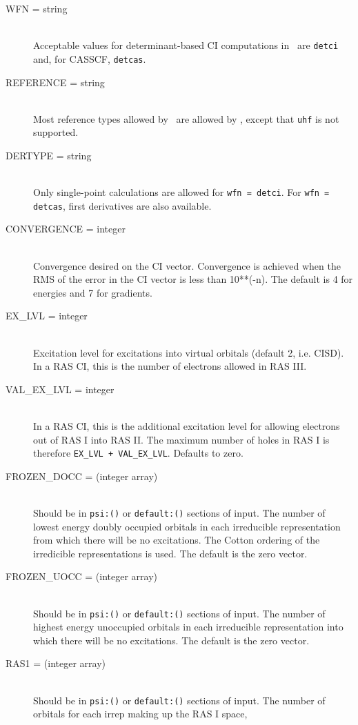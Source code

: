 \begin{description}
\item[WFN = string]\mbox{}\\
Acceptable values for determinant-based CI computations in \PSIthree\
are {\tt detci} and, for CASSCF, {\tt detcas}.
\item[REFERENCE = string]\mbox{}\\
Most reference types allowed by \PSIthree\ are allowed by \PSIdetci,
except that {\tt uhf} is not supported.
\item[DERTYPE = string]\mbox{}\\
Only single-point calculations are allowed for {\tt wfn = detci}.
For {\tt wfn = detcas}, first derivatives are also available.
\item[CONVERGENCE = integer]\mbox{}\\
Convergence desired on the CI vector.  Convergence is achieved when the
RMS of the error in the CI vector is less than 10**(-n).  The default is 4
for energies and 7 for gradients.
\item[EX\_LVL = integer]\mbox{}\\
Excitation level for excitations into virtual
orbitals (default 2, i.e. CISD).  In a RAS CI, this is the number
of electrons allowed in RAS III.
\item[VAL\_EX\_LVL = integer]\mbox{}\\
In a RAS CI, this is the additional excitation level for allowing
electrons out of RAS I into RAS II.  The maximum number of holes in RAS I
is therefore {\tt EX\_LVL + VAL\_EX\_LVL}.  Defaults to zero.
\item[FROZEN\_DOCC = (integer array)]\mbox{}\\
Should be in {\tt psi:()} or {\tt default:()} sections of input.
The number of lowest energy doubly occupied orbitals in each irreducible
representation from which there will be no excitations.
The Cotton ordering of the irredicible representations is used.
The default is the zero vector.
\item[FROZEN\_UOCC = (integer array)]\mbox{}\\
Should be in {\tt psi:()} or {\tt default:()} sections of input.
The number of highest energy unoccupied orbitals in each irreducible
representation into which there will be no excitations.
The default is the zero vector.
\item[RAS1 = (integer array)]\mbox{}\\
Should be in {\tt psi:()} or {\tt default:()} sections of input.
The number of orbitals for each irrep making up the RAS I space,

\end{description}
